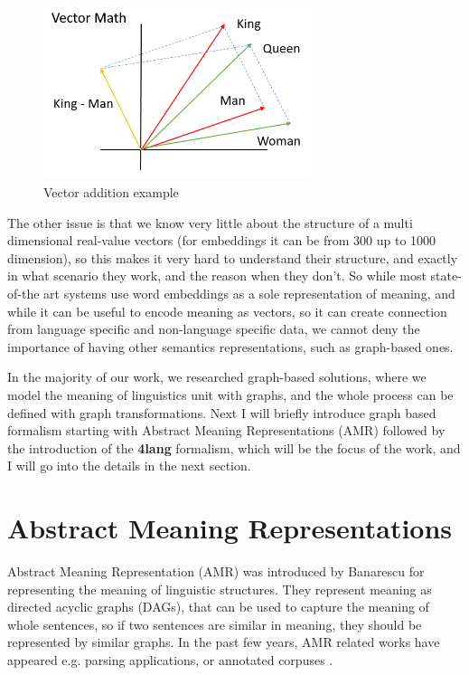 \begin{figure}[h!]
	\centering
	\includegraphics[width=0.7\textwidth]{figures/vecs}
	\caption{Vector addition example}
	\label{fig:vecs}
\end{figure}

The other issue is that we know very little about the structure of a multi dimensional real-value vectors (for embeddings it can be from 300 up to 1000 dimension), so this makes it very hard to understand their structure, and exactly in what scenario they work, and the reason when they don't. So while most state-of-the art systems use word embeddings as a sole representation of meaning, and while it can be useful to encode meaning as vectors, so it can create connection from language specific and non-language specific data, we cannot deny the importance of having other semantics representations, such as graph-based ones. 

In the majority of our work, we researched graph-based solutions, where we model the meaning of linguistics unit with graphs, and the whole process can be defined with graph transformations. Next I will briefly introduce graph based formalism starting with Abstract Meaning Representations (AMR) followed by the introduction of the \textbf{4lang} formalism, which will be the focus of the work, and I will go into the details in the next section.

\section{Abstract Meaning Representations}
Abstract Meaning Representation (AMR) was introduced by Banarescu\cite{Banarescu:2013} for representing the meaning of linguistic structures. They represent meaning as directed acyclic graphs (DAGs), that can be used to capture the meaning of whole sentences, so if two sentences are similar in meaning, they should be represented by similar graphs. In the past few years, AMR related works have appeared e.g. parsing applications, or annotated corpuses \cite{Banarescu:2013, OGorman2018AMRBT, DAC:2017}.

